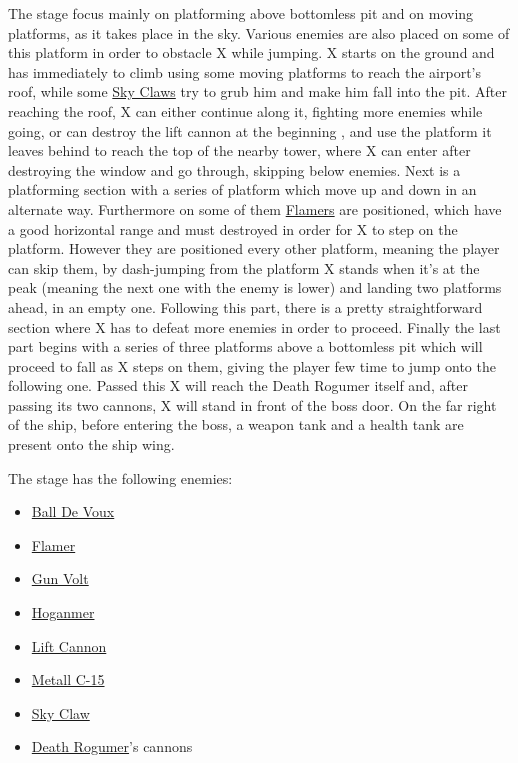 The stage focus mainly on platforming above bottomless pit and on moving platforms, as it takes place in the sky. Various enemies are also placed on some of this platform in order to obstacle X while jumping. X starts on the ground and has immediately to climb using some moving platforms to reach the airport's roof, while some \hyperlink{enem:Sky_Claw}{Sky Claws} try to grub him and make him fall into the pit. After reaching the roof, X can either continue along it, fighting more enemies while going, or can destroy the lift cannon at the beginning , and use the platform it leaves behind to reach the top of the nearby tower, where X can enter after destroying the window and go through, skipping below enemies. Next is a platforming section with a series of platform which move up and down in an alternate way. Furthermore on some of them \hyperlink{enem:Flamer}{Flamers} are positioned, which have a good horizontal range and must destroyed in order for X to step on the platform. However they are positioned every other platform, meaning the player can skip them, by dash-jumping from the platform X stands when it's at the peak (meaning the next one with the enemy is lower) and landing two platforms ahead, in an empty one. Following this part, there is a pretty straightforward section where X has to defeat more enemies in order to proceed. Finally the last part begins with a series of three platforms above a bottomless pit which will proceed to fall as X steps on them, giving the player few time to jump onto the following one. Passed this X will reach the Death Rogumer itself and, after passing its two cannons, X will stand in front of the boss door. On the far right of the ship, before entering the boss, a weapon tank and a health tank are present onto the ship wing.

The stage has the following enemies\cite{wiki:Airport}:
\begin{itemize}
	\item \hyperlink{enem:Ball_De_Voux}{Ball De Voux }
	\item \hyperlink{enem:Flamer}{Flamer}
	\item \hyperlink{enem:Gun_Volt}{Gun Volt}
	\item \hyperlink{enem:Hoganmer}{Hoganmer}
	\item \hyperlink{enem:Lift Cannon}{Lift Cannon}
	\item \hyperlink{enem:Metall_C-15}{Metall C-15}
	\item \hyperlink{enem:Sky_Claw}{Sky Claw}
	\item \hyperlink{veichle:Death Rogumer}{Death Rogumer}'s cannons
\end{itemize}

